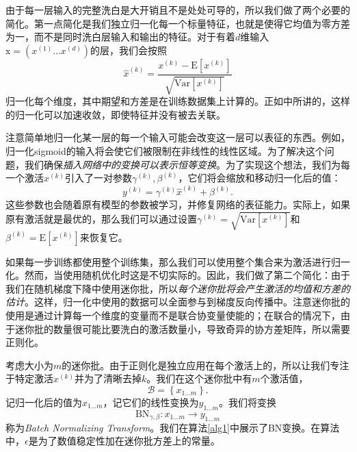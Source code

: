 \documentclass[../main.tex]{subfile}
\begin{document}
由于每一层输入的完整洗白是大开销且不是处处可导的，所以我们做了两个必要的简化。第一点简化是我们独立归一化每一个标量特征，也就是使得它均值为零方差为一，而不是同时洗白层输入和输出的特征。对于有着$d$维输入$\text{x} = \left( x^{\left( 1 \right)} \ldots x^{\left( d \right)}\right)$的层，我们会按照
\begin{equation*}
    \hat{x}^{\left(k\right)} = \frac{x^{\left(k\right)} - \text{E}\left[ x ^{\left( k \right)}\right]}{\sqrt{\text{Var}\left[ x^{\left( k \right)} \right]}}
\end{equation*}
归一化每个维度，其中期望和方差是在训练数据集上计算的。正如\cite{backprop}中所讲的，这样的归一化可以加速收敛，即使特征并没有被去关联。

注意简单地归一化某一层的每一个输入可能会改变这一层可以表征的东西。例如，归一化sigmoid的输入将会使它们被限制在非线性的线性区域。为了解决这个问题，我们确保\textit{插入网络中的变换可以表示恒等变换}。为了实现这个想法，我们为每一个激活$x^{\left( k \right)}$引入了一对参数$\gamma^{\left( k \right)}, \beta^{\left( k \right)}$，它们将会缩放和移动归一化后的值：
\begin{equation*}
    y^{\left( k \right)} = \gamma^{\left( k \right)}\hat{x}^{\left( k \right)} + \beta^{\left( k \right)}.
\end{equation*}
这些参数也会随着原有模型的参数被学习，并修复网络的表征能力。实际上，如果原有激活就是最优的，那么我们可以通过设置$\gamma^{\left( k \right)} = \sqrt{\text{Var}\left[ x^{\left( k \right)} \right]}$和$\beta^{\left( k \right)} = \text{E}\left[ x^{\left( k \right)} \right]$来恢复它。

如果每一步训练都使用整个训练集，那么我们可以使用整个集合来为激活进行归一化。然而，当使用随机优化时这是不切实际的。因此，我们做了第二个简化：由于我们在随机梯度下降中使用迷你批，所以\textit{每个迷你批将会产生激活的均值和方差的估计}。这样，归一化中使用的数据可以全面参与到梯度反向传播中。注意迷你批的使用是通过计算每一个维度的变量而不是联合协变量使能的；在联合的情况下，由于迷你批的数量很可能比要洗白的激活数量小，导致奇异的协方差矩阵，所以需要正则化。

考虑大小为$m$的迷你批。由于正则化是独立应用在每个激活上的，所以让我们专注于特定激活$x^{\left( k \right)}$并为了清晰去掉$k$。我们在这个迷你批中有$m$个激活值，
\begin{equation*}
    \mathcal{B} = \left\{ x_{1 \ldots m} \right\}.
\end{equation*}
记归一化后的值为$\hat{x}_{1 \ldots m}$，记它们的线性变换为$y_{1 \ldots m}$。我们将变换
\begin{equation*}
    \text{BN}_{\gamma,\beta}:x_{1 \ldots m} \rightarrow y_{1 \ldots m}
\end{equation*}
称为\textit{Batch Normalizing Transform}。我们在算法\ref{alg1}中展示了BN变换。在算法中，$\epsilon$是为了数值稳定性加在迷你批方差上的常量。
\end{document}
